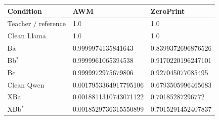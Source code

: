 \begin{tabular}{lll}
\toprule
Condition & AWM & ZeroPrint \\
\midrule
Teacher / reference & 1.0 & 1.0 \\
Clean Llama & 1.0 & 1.0 \\
Ba & 0.9999974135841643 & 0.8399372696876526 \\
Bb$^\ast$ & 0.9999961065394538 & 0.9170220196247101 \\
Bc & 0.9999972975679806 & 0.927045077085495 \\
Clean Qwen & 0.0017953364917795106 & 0.6793505996465683 \\
XBa & 0.0018811310743071122 & 0.70185287296772 \\
XBb$^\ast$ & 0.0018529736315550899 & 0.7015291452407837 \\
\bottomrule
\end{tabular}

